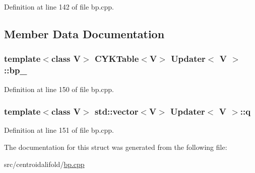 Definition at line 142 of file bp.\+cpp.



\subsection{Member Data Documentation}
\hypertarget{struct_updater_a42ded2de185caa0a4ac98bf2dc45a3f8}{
\subsubsection[{bp\+\_\+}]{\setlength{\rightskip}{0pt plus 5cm}template$<$class V$>$ {\bf C\+Y\+K\+Table}$<$V$>$ {\bf Updater}$<$ V $>$\+::bp\+\_\+}}\label{struct_updater_a42ded2de185caa0a4ac98bf2dc45a3f8}


Definition at line 150 of file bp.\+cpp.

\hypertarget{struct_updater_a0e7e32e00a5e6c8dda358f47eadf1b1c}{
\subsubsection[{q}]{\setlength{\rightskip}{0pt plus 5cm}template$<$class V$>$ std\+::vector$<$V$>$ {\bf Updater}$<$ V $>$\+::q}}\label{struct_updater_a0e7e32e00a5e6c8dda358f47eadf1b1c}


Definition at line 151 of file bp.\+cpp.



The documentation for this struct was generated from the following file\+:\begin{DoxyCompactItemize}
\item 
src/centroidalifold/\hyperlink{bp_8cpp}{bp.\+cpp}\end{DoxyCompactItemize}
